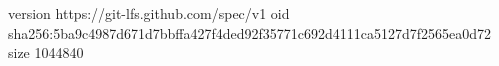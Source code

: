 version https://git-lfs.github.com/spec/v1
oid sha256:5ba9c4987d671d7bbffa427f4ded92f35771c692d4111ca5127d7f2565ea0d72
size 1044840
